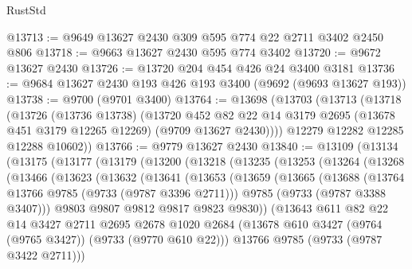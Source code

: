 \begin{lexlean}{RustStd}
\begin{coremodule}
@13713 := @9649 @13627 @2430 @309 @595 @774 @22 @2711 @3402 @2450 @806
@13718 := @9663 @13627 @2430 @595 @774 @3402
@13720 := @9672 @13627 @2430
@13726 := @13720 @204 @454 @426 @24 @3400 @3181
@13736 := @9684 @13627 @2430 @193 @426 @193 @3400 (@9692 (@9693 @13627 @193))
@13738 := @9700 (@9701 @3400)
@13764 := @13698
    (@13703
      (@13713
        (@13718
          (@13726
            (@13736 @13738)
            (@13720
              @452
              @82
              @22
              @14
              @3179
              @2695
              (@13678 @451 @3179 @12265 @12269)
              (@9709 @13627 @2430))))
        @12279
        @12282
        @12285
        @12288
        @10602))
@13766 := @9779 @13627 @2430
@13840 := @13109
    (@13134
      (@13175
        (@13177
          (@13179
            (@13200
              (@13218
                (@13235
                  (@13253
                    (@13264
                      (@13268
                        (@13466
                          (@13623
                            (@13632
                              (@13641
                                (@13653
                                  (@13659
                                    (@13665
                                      (@13688
                                        (@13764 @13766 @9785 (@9733 (@9787 @3396 @2711)))
                                        @9785
                                        (@9733 (@9787 @3388 @3407)))
                                      @9803
                                      @9807
                                      @9812
                                      @9817
                                      @9823
                                      @9830))
                                  (@13643
                                    @611
                                    @82
                                    @22
                                    @14
                                    @3427
                                    @2711
                                    @2695
                                    @2678
                                    @1020
                                    @2684
                                    (@13678
                                      @610
                                      @3427
                                      (@9764 (@9765 @3427))
                                      (@9733 (@9770 @610 @22)))
                                    @13766
                                    @9785
                                    (@9733 (@9787 @3422 @2711)))

\end{coremodule}
\end{lexlean}
